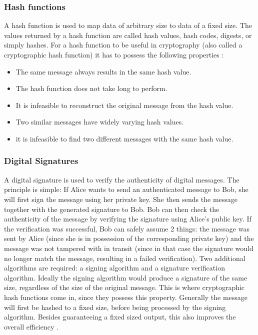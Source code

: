 \subsubsection{Hash functions} 
\label{subsec:hash_functions}

A hash function is used to map data of arbitrary size to data of a fixed size. The values returned by a hash function are called hash values, hash codes, digests, or simply hashes. For a hash function to be useful in cryptography (also called a cryptographic hash function) it has to possess the following properties \cite{wiki:Hash}:

\begin{itemize}
	\item The same message always results in the same hash value.
	\item The hash function does not take long to perform.
	\item It is infeasible to reconstruct the original message from the hash value.
	\item Two similar messages have widely varying hash values.
	\item it is infeasible to find two different messages with the same hash value.
\end{itemize}

\subsubsection{Digital Signatures} 
\label{subsec:digital_signature}

A digital signature is used to verify the authenticity of digital messages. The principle is simple: If Alice wants to send an authenticated message to Bob, she will first sign the message using her private key. She then sends the message together with the generated signature to Bob. Bob can then check the authenticity of the message by verifying the signature using Alice's public key. If the verification was successful, Bob can safely assume 2 things: the message was sent by Alice (since she is in possession of the corresponding private key) and the message was not tampered with in transit (since in that case the signature would no longer match the message, resulting in a failed verification). Two additional algorithms are required: a signing algorithm and a signature verification algorithm. Ideally the signing algorithm would produce a signature of the same size, regardless of the size of the original message. This is where cryptographic hash functions come in, since they possess this property. Generally the message will first be hashed to a fixed size, before being processed by the signing algorithm. Besides guaranteeing a fixed sized output, this also improves the overall efficiency \cite{wiki:DigitalSignature}.

